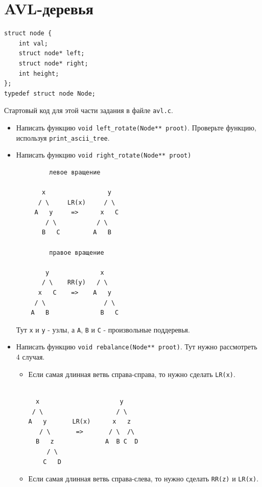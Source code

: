 \documentclass{article}
\begin{document}
\iffalse
\newpage
\section*{AVL-деревья}

\begin{lstlisting}
struct node {
    int val;
    struct node* left;
    struct node* right;
    int height;
};
typedef struct node Node;
\end{lstlisting}
Стартовый код для этой части задания в файле \texttt{avl.c}.
\begin{itemize}
\item Написать функцию \texttt{void left\_rotate(Node** proot)}. Проверьте функцию, используя \texttt{print\_ascii\_tree}.
\item Написать функцию \texttt{void right\_rotate(Node** proot)}
\begin{multicols}{2}
\noindent
\begin{lstlisting}
         левое вращение

       x                 y     
      / \     LR(x)     / \     
     A   y     =>      x   C    
        / \           / \       
       B   C         A   B      

         правое вращение
   
        y              x 
       / \    RR(y)   / \
      x   C    =>    A   y
     / \                / \
    A   B              B   C
\end{lstlisting}
\end{multicols}
Тут \texttt{x} и \texttt{y} - узлы, а \texttt{A}, \texttt{B} и \texttt{С} - произвольные поддеревья.
\item Написать функцию \texttt{void rebalance(Node** proot)}. Тут нужно рассмотреть 4 случая. 
\begin{itemize}
\item Если самая длинная ветвь справа-справа, то нужно сделать \texttt{LR(x)}.
\begin{lstlisting}
       
  x                      y                  
 / \                    / \                  
A   y       LR(x)      x   z                 
   / \       =>       / \  /\                        
  B   z              A  B C  D                          
     / \                                        
    C   D                                         
\end{lstlisting}
\item Если самая длинная ветвь справа-слева, то нужно сделать \texttt{RR(z)} и \texttt{LR(x)}.
\begin{lstlisting}
       

\end{lstlisting}
\end{itemize}
\end{itemize}
\end{document}
